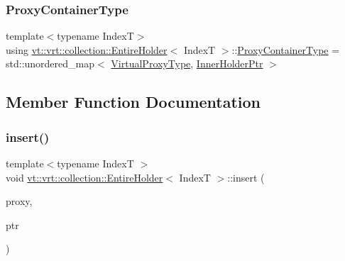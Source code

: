 \mbox{\label{structvt_1_1vrt_1_1collection_1_1_entire_holder_a8d1ceab08d81edb0d45f48ee84a05eea}} 
\subsubsection{\texorpdfstring{Proxy\+Container\+Type}{ProxyContainerType}}
{\footnotesize\ttfamily template$<$typename IndexT$>$ \\
using \hyperlink{structvt_1_1vrt_1_1collection_1_1_entire_holder}{vt\+::vrt\+::collection\+::\+Entire\+Holder}$<$ IndexT $>$\+::\hyperlink{structvt_1_1vrt_1_1collection_1_1_entire_holder_a8d1ceab08d81edb0d45f48ee84a05eea}{Proxy\+Container\+Type} =  std\+::unordered\+\_\+map$<$ \hyperlink{namespacevt_a1b417dd5d684f045bb58a0ede70045ac}{Virtual\+Proxy\+Type}, \hyperlink{structvt_1_1vrt_1_1collection_1_1_entire_holder_a05b515860b3cb0eac013993a5e487b72}{Inner\+Holder\+Ptr} $>$}



\subsection{Member Function Documentation}
\mbox{\label{structvt_1_1vrt_1_1collection_1_1_entire_holder_aecd10b8636b011dbd5681030d636d185}} 
\subsubsection{\texorpdfstring{insert()}{insert()}}
{\footnotesize\ttfamily template$<$typename IndexT $>$ \\
void \hyperlink{structvt_1_1vrt_1_1collection_1_1_entire_holder}{vt\+::vrt\+::collection\+::\+Entire\+Holder}$<$ IndexT $>$\+::insert (\begin{DoxyParamCaption}\item[{\hyperlink{namespacevt_a1b417dd5d684f045bb58a0ede70045ac}{Virtual\+Proxy\+Type} const \&}]{proxy,  }\item[{\hyperlink{structvt_1_1vrt_1_1collection_1_1_entire_holder_a05b515860b3cb0eac013993a5e487b72}{Inner\+Holder\+Ptr}}]{ptr }\end{DoxyParamCaption})\hspace{0.3cm}{\ttfamily [static]}}


